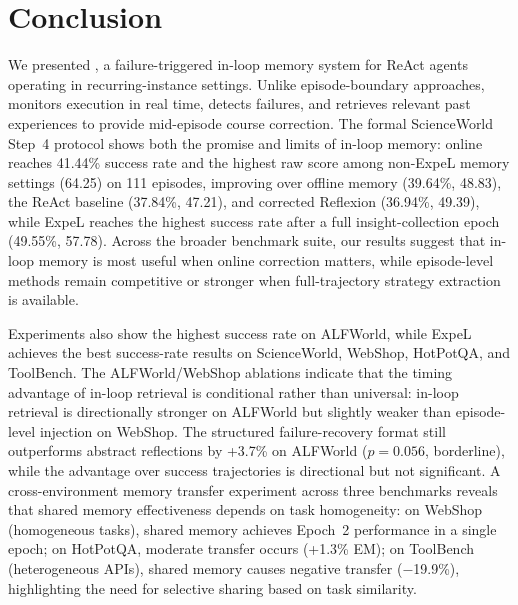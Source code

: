 \section{Conclusion}
\label{sec:conclusion}

We presented \method{}, a failure-triggered in-loop memory system for ReAct agents operating in recurring-instance settings. Unlike episode-boundary approaches, \method{} monitors execution in real time, detects failures, and retrieves relevant past experiences to provide mid-episode course correction. The formal ScienceWorld Step~4 protocol shows both the promise and limits of in-loop memory: online \method{} reaches 41.44\% success rate and the highest raw score among non-ExpeL memory settings (64.25) on 111 episodes, improving over offline memory (39.64\%, 48.83), the ReAct baseline (37.84\%, 47.21), and corrected Reflexion (36.94\%, 49.39), while ExpeL reaches the highest success rate after a full insight-collection epoch (49.55\%, 57.78). Across the broader benchmark suite, our results suggest that in-loop memory is most useful when online correction matters, while episode-level methods remain competitive or stronger when full-trajectory strategy extraction is available.

Experiments also show the highest success rate on ALFWorld, while ExpeL achieves the best success-rate results on ScienceWorld, WebShop, HotPotQA, and ToolBench. The ALFWorld/WebShop ablations indicate that the timing advantage of in-loop retrieval is conditional rather than universal: in-loop retrieval is directionally stronger on ALFWorld but slightly weaker than episode-level injection on WebShop. The structured failure-recovery format still outperforms abstract reflections by +3.7\% on ALFWorld ($p{=}0.056$, borderline), while the advantage over success trajectories is directional but not significant. A cross-environment memory transfer experiment across three benchmarks reveals that shared memory effectiveness depends on task homogeneity: on WebShop (homogeneous tasks), shared memory achieves Epoch~2 performance in a single epoch; on HotPotQA, moderate transfer occurs (+1.3\% EM); on ToolBench (heterogeneous APIs), shared memory causes negative transfer ($-$19.9\%), highlighting the need for selective sharing based on task similarity.

